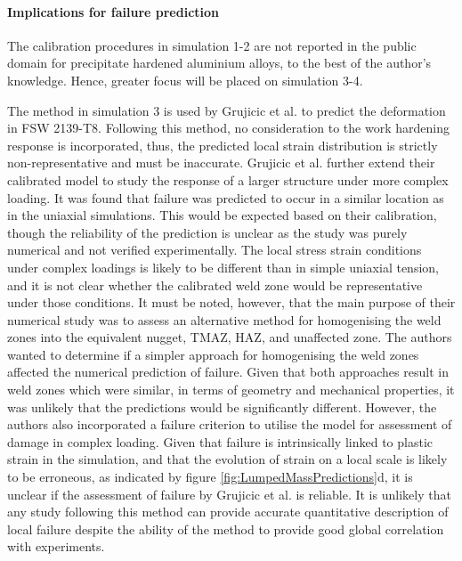 \paragraph{Implications for failure prediction}
\label{SMDModellingstudyResultsSims1to4Correction1Implications}
The calibration procedures in simulation 1-2 are not reported in the public domain for precipitate hardened aluminium alloys, to the best of the author's knowledge. Hence, greater focus will be placed on simulation 3-4. 

The method in simulation 3 is used by Grujicic et al. \cite{Grujicic2011} to predict the deformation in FSW 2139-T8. Following this method, no consideration to the work hardening response is incorporated, thus, the predicted local strain distribution is strictly non-representative and must be inaccurate. Grujicic et al. \cite{Grujicic2011} further extend their calibrated model to study the response of a larger structure under more complex loading. It was found that failure was predicted to occur in a similar location as in the uniaxial simulations. This would be expected based on their calibration, though the reliability of the prediction is unclear as the study was purely numerical and not verified experimentally. The local stress strain conditions under complex loadings is likely to be different than in simple uniaxial tension, and it is not clear whether the calibrated weld zone would be representative under those conditions. It must be noted, however, that the main purpose of their numerical study was to assess an alternative method for homogenising the weld zones into the equivalent nugget, TMAZ, HAZ, and unaffected zone. The authors wanted to determine if a simpler approach for homogenising the weld zones affected the numerical prediction of failure. Given that both approaches result in weld zones which were similar, in terms of geometry and mechanical properties, it was unlikely that the predictions would be significantly different. However, the authors also incorporated a failure criterion to utilise the model for assessment of damage in complex loading. Given that failure is intrinsically linked to plastic strain in the simulation, and that the evolution of strain on a local scale is likely to be erroneous, as indicated by figure \ref{fig:LumpedMassPredictions}d, it is unclear if the assessment of failure by Grujicic et al. is reliable. It is unlikely that any study following this method can provide accurate quantitative description of local failure despite the ability of the method to provide good global correlation with experiments.

